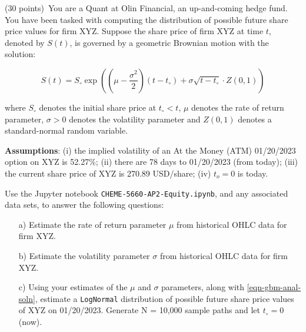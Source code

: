 \item{(30 points)~You are a Quant at Olin Financial, an up-and-coming hedge fund. You have been tasked with computing the distribution of possible future share price values for firm XYZ.
Suppose the share price of firm XYZ at time $t$, denoted by $S(t)$, is governed by a geometric Brownian motion with the solution:

\begin{equation}\label{eqn-gbm-anal-soln}
S(t) = S_{\circ}\exp\left(\left(\mu - \frac{\sigma^{2}}{2}\right)\left(t-t_{\circ}\right)+\sigma\sqrt{t-t_{\circ}}\cdot{Z(0,1)}\right)
\end{equation}

where $S_{\circ}$ denotes the initial share price at $t_{\circ}<t$, $\mu$ denotes the rate of return parameter, 
$\sigma>0$ denotes the volatility parameter and $Z\left(0,1\right)$ denotes a standard-normal random variable. 

\textbf{Assumptions}: (i) the implied volatility of an At the Money (ATM) 01/20/2023 option on XYZ is 52.27\%; 
(ii) there are 78 days to 01/20/2023 (from today); (iii) the current share price of XYZ is 270.89 USD/share; 
(iv) $t_{o} = 0$ is today.

Use the Jupyter notebook \texttt{CHEME-5660-AP2-Equity.ipynb}, and any associated data sets, to answer the following questions:
\begin{itemize}
    \item[a)]{Estimate the rate of return parameter $\mu$ from historical OHLC data for firm XYZ.}
    \item[b)]{Estimate the volatility parameter $\sigma$ from historical OHLC data for firm XYZ.}
    \item[c)]{Using your estimates of the $\mu$ and $\sigma$ parameters, along with \eqref{eqn-gbm-anal-soln}, estimate a \texttt{LogNormal} distribution of possible future share price values of XYZ on 01/20/2023.
    Generate N = 10,000 sample paths and let $t_{\circ} = 0$ (now).}
\end{itemize}
}
